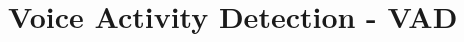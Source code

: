 \documentclass[main.tex]{subfiles}
\begin{document}
\section{Voice Activity Detection - VAD}
\end{document}
